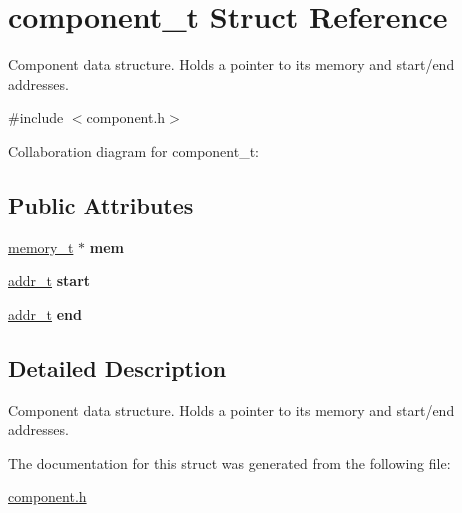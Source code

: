 \hypertarget{structcomponent__t}{}\section{component\+\_\+t Struct Reference}
\label{structcomponent__t}


Component data structure. Holds a pointer to its memory and start/end addresses.  




{\ttfamily \#include $<$component.\+h$>$}



Collaboration diagram for component\+\_\+t\+:
\subsection*{Public Attributes}
\begin{DoxyCompactItemize}
\item 
\mbox{\label{structcomponent__t_a47e2eb15b16e0f327529a8b894f31a77}} 
\hyperlink{structmemory__t}{memory\+\_\+t} $\ast$ {\bfseries mem}
\item 
\mbox{\label{structcomponent__t_a4b01641cc05efbf54a89948f1b7646c6}} 
\hyperlink{memory_8h_a8a6444037e4d5cc2bf8ba22a9d9e33ca}{addr\+\_\+t} {\bfseries start}
\item 
\mbox{\label{structcomponent__t_a47d53307c8d520dc700e7a4ddb76c3a9}} 
\hyperlink{memory_8h_a8a6444037e4d5cc2bf8ba22a9d9e33ca}{addr\+\_\+t} {\bfseries end}
\end{DoxyCompactItemize}


\subsection{Detailed Description}
Component data structure. Holds a pointer to its memory and start/end addresses. 

The documentation for this struct was generated from the following file\+:\begin{DoxyCompactItemize}
\item 
\hyperlink{component_8h}{component.\+h}\end{DoxyCompactItemize}
